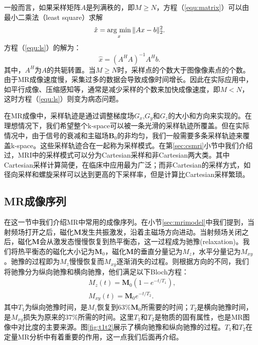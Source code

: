 一般而言，如果采样矩阵$A$是列满秩的，即$M\geq N$，方程（\ref{equ:matrix}）可以由最小二乘法（least square）求解
\begin{equation}
	\hat{x} = \argmin_x \|Ax-b\|^2_2.
	\label{equ:ls}
\end{equation}
方程（\ref{equ:ls}）的解为：
\begin{equation}
	\hat{x} = (A^HA)^{-1}A^Hb.
	\label{equ:lss}
\end{equation}
其中，$A^H$为$A$的共轭转置。当$M\geq N$时，采样点的个数大于图像像素点的个数。由于MR成像速度慢，采集过多的数据会导致成像时间增长。因此在实际应用中，如平行成像、压缩感知等，通常是减少采样的个数来加快成像速度，即$M<N$，这时方程（\ref{equ:ls}）则变为病态问题。

在MR成像中，采样轨迹是通过调整梯度场$G_x$,$G_y$和$G_z$的大小和方向来实现的。在理想情况下，我们希望整个k-space可以被一条光滑的采样轨迹所覆盖。但在实际情况中，由于信号的衰减和主磁场$\mathrm{\textbf{B}}_0$的非均匀，我们一般需要多条采样轨迹来覆盖k-space。这些采样轨迹合在一起称为采样模式。在第\ref{sec:csmri}小节中我们介绍过，MRI中的采样模式可以分为Cartesian采样和非Cartesian两大类。其中Cartesian采样计算简便，在临床中应用最为广泛；而非Cartesian的采样方式，如径向采样和螺旋采样可以达到更高的下采样率，但是计算比Cartesian采样繁琐。

\subsection{MR成像序列}
在这一节中我们介绍MR中常用的成像序列。在小节\ref{sec:mrimodel}中我们提到，当射频场打开之后，磁化$\mathrm{\textbf{M}}$发生共振激发，沿着主磁场方向进动。当射频场关闭之后，磁化$\mathrm{\textbf{M}}$会从激发态慢慢恢复到热平衡态，这一过程成为驰豫(relaxation)。我们将热平衡态的磁化大小记为$\mathrm{\textbf{M}}_0$，磁化$\mathrm{\textbf{M}}$的垂直分量记为$M_z$，水平分量记为$M_{xy}$。驰豫的过程即为$M_z$慢慢恢复而$M_{xy}$逐渐消失的过程。则根据方向的不同，我们将驰豫分为纵向驰豫和横向驰豫，他们满足以下Bloch方程\cite{bloch}：
\begin{equation}
\begin{aligned}
	&M_z(t)=\mathrm{\textbf{M}}_0(1-e^{-t/T_1}),\\
	&M_{xy}(t)=\mathrm{\textbf{M}}_0e^{-t/T_2}.
\end{aligned}
\end{equation}
其中$T_1$为纵向弛豫时间，是$M_z$恢复到63\%$\mathrm{\textbf{M}}_0$所需要的时间；$T_2$是横向驰豫时间，是$M_{xy}$损失为原来的37\%所需的时间。这里$T_1$和$T_2$是物质的固有属性，也是MR图像中对比度的主要来源。图\ref{fig:t1t2}展示了横向驰豫和纵向驰豫的过程。$T_1$和$T_2$在定量MR分析中有着重要的作用，这一点我们后面再介绍。

